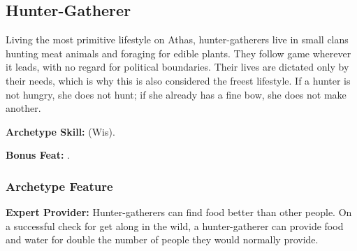 \subsection{Hunter-Gatherer}
Living the most primitive lifestyle on Athas, hunter-gatherers live in small clans  hunting meat animals and foraging for edible plants. They follow game wherever it leads, with no regard for political boundaries. Their lives are dictated only by their needs, which is why this is also considered the freest lifestyle. If a hunter is not hungry, she does not hunt; if she already has a fine bow, she does not make another.

\textbf{Archetype Skill:}  (Wis).

\textbf{Bonus Feat:} .

\subsubsection{Archetype Feature}
\textbf{Expert Provider:} Hunter-gatherers can find food better than other people. On a successful  check for get along in the wild, a hunter-gatherer can provide food and water for double the number of people they would normally provide.
